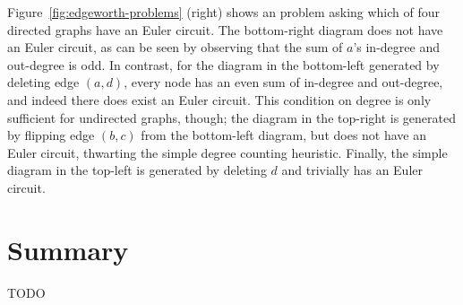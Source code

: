 Figure~\ref{fig:edgeworth-problems} (right) shows an \Edgeworth problem asking which of four directed graphs have an Euler circuit. The bottom-right diagram does not have an Euler circuit, as can be seen by observing that the sum of $a$'s in-degree and out-degree is odd. In contrast, for the diagram in the bottom-left generated by deleting edge $(a, d)$, every node has an even sum of in-degree and out-degree, and indeed there does exist an Euler circuit. This condition on degree is only sufficient for undirected graphs, though; the diagram in the top-right is generated by flipping edge $(b, c)$ from the bottom-left diagram, but does not have an Euler circuit, thwarting the simple degree counting heuristic. Finally, the simple diagram in the top-left is generated by deleting $d$ and trivially has an Euler circuit. 

\section{Summary}

TODO





 
